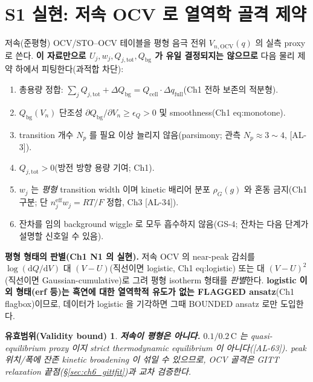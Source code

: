 \documentclass[11pt,a4paper]{article}
\newtheorem*{boundbox}{유효범위(Validity bound)}
\newcommand{\dd}{\mathrm{d}}
\newcommand{\eff}{\mathrm{eff}}
\newcommand{\bg}{\mathrm{bg}}
\newcommand{\cell}{\mathrm{cell}}
\newcommand{\OCV}{\mathrm{OCV}}
\newcommand{\tot}{\mathrm{tot}}
\newcommand{\AL}[1]{\textsf{[AL-#1]}}
\begin{document}
\section{S1 실현: 저속 OCV 로 열역학 골격 제약}\label{sec:ch6_ocvfit}
저속(준평형) OCV/STO--OCV 테이블을 평형 음극 전위 $V_{n,\OCV}(q)$ 의 실측 proxy 로 쓴다. \textbf{이 자료만으로
$U_j,w_j,Q_{j,\tot},Q_\bg$ 가 유일 결정되지는 않으므로} 다음 물리 제약 하에서 피팅한다(과적합 차단):
\begin{enumerate}[label=O\arabic*),leftmargin=2.4em]
\item 총용량 정합: $\sum_j Q_{j,\tot}+\Delta Q_\bg=Q_\cell\cdot\Delta q_{\mathrm{full}}$(Ch1 전하 보존의 적분형).
\item $Q_\bg(V_n)$ 단조성 $\partial Q_\bg/\partial V_n\ge\epsilon_Q>0$ 및 smoothness(Ch1 eq:monotone).
\item transition 개수 $N_p$ 를 필요 이상 늘리지 않음(parsimony; 관측 $N_p\approx3\sim4$, \AL{3}).
\item $Q_{j,\tot}>0$(방전 방향 용량 기여; Ch1).
\item $w_j$ 는 \emph{평형} transition width 이며 kinetic 배리어 분포 $\rho_G(g)$ 와 혼동 금지(Ch1 구분; 단
  $n_j^{\eff}w_j=RT/F$ 정합, Ch3 \AL{34}).
\item 잔차를 임의 background wiggle 로 모두 흡수하지 않음(GS-4; 잔차는 다음 단계가 설명할 신호일 수 있음).
\end{enumerate}
\textbf{평형 형태의 판별(Ch1 N1 의 실현).} 저속 OCV 의 near-peak 감쇠를 $\log(\dd Q/\dd V)$ 대 $(V-U)$(직선이면
logistic, Ch1 eq:logistic) 또는 대 $(V-U)^2$(직선이면 Gaussian-cumulative)로 그려 평형 isotherm 형태를
\emph{판별}한다. \textbf{logistic 이외 형태(erf 등)는 흑연에 대한 열역학적 유도가 없는 FLAGGED ansatz}(Ch1
flagbox)이므로, 데이터가 logistic 을 기각하면 그때 BOUNDED ansatz 로만 도입한다.
\begin{boundbox}
\textbf{저속이 평형은 아니다.} $0.1/0.2\,\mathrm C$ 는 \emph{quasi-equilibrium proxy} 이지 strict thermodynamic
equilibrium 이 아니다(\AL{63}). peak 위치/폭에 잔존 kinetic broadening 이 섞일 수 있으므로, OCV 골격은 GITT
relaxation 끝점(\S\ref{sec:ch6_gittfit})과 교차 검증한다.
\end{boundbox}

\end{document}
